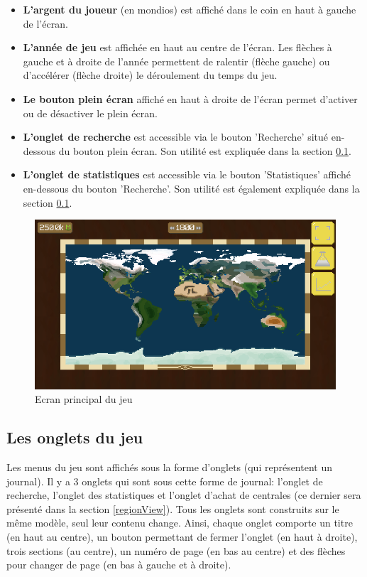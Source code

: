 \documentclass{article}
\begin{document}
		\begin{itemize}
			\item \textbf{L'argent du joueur} (en mondios) est affiché dans le coin en haut à gauche de l'écran.
			\item \textbf{L'année de jeu} est affichée en haut au centre de l'écran. Les flèches à gauche et à droite de l'année permettent de ralentir (flèche gauche) ou d’accélérer (flèche droite) le déroulement du temps du jeu.
			\item \textbf{Le bouton plein écran} affiché en haut à droite de l'écran permet d'activer ou de désactiver le plein écran.
			\item \textbf{L'onglet de recherche} est accessible via le bouton 'Recherche' situé en-dessous du bouton plein écran. Son utilité est expliquée dans la section \ref{onglets}.
			\item  \textbf{L'onglet de statistiques} est accessible via le bouton 'Statistiques' affiché en-dessous du bouton 'Recherche'. Son utilité est également expliquée dans la section \ref{onglets}.
		\end{itemize}
		
		\begin{figure}[H]
                \includegraphics[width=\linewidth]{../images/worldView}
                \caption{Ecran principal du jeu}
                \label{fig:worldView}
        \end{figure} 
		
		\subsection{Les onglets du jeu} \label{onglets}
		Les menus du jeu sont affichés sous la forme d'onglets (qui représentent un journal).
		Il y a 3 onglets qui sont sous cette forme de journal: l'onglet de recherche, l'onglet des statistiques et l'onglet d'achat de centrales (ce dernier sera présenté dans la section \ref{regionView}).
		Tous les onglets sont construits sur le même modèle, seul leur contenu change. Ainsi, chaque onglet comporte un titre (en haut au centre), un bouton permettant de fermer l'onglet (en haut à droite), trois sections (au centre), un numéro de page (en bas au centre) et des flèches pour changer de page (en bas à gauche et à droite).
		
\end{document}

